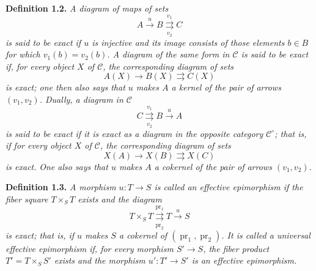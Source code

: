 \medskip
\noindent{}\textbf{Definition 1.2.}
\textit{A diagram of maps of sets}
\[
  A\xrightarrow{u}B
  \overset{v_1}{\underset{v_2}{\rightrightarrows}}C
\]
\textit{is said to be \emph{exact} if \(u\) is injective and its image consists
of those elements \(b\in B\) for which \(v_1(b)=v_2(b)\). A diagram of the
same form in \(\mathscr C\) is said to be \emph{exact} if, for every object
\(X\) of \(\mathscr C\), the corresponding diagram of sets}
\[
  A(X)\longrightarrow B(X)\rightrightarrows C(X)
\]
\textit{is exact; one then also says that \(u\) makes \(A\) a \emph{kernel}
of the pair of arrows \((v_1,v_2)\). Dually, a diagram in \(\mathscr C\)}
\[
  C\overset{v_1}{\underset{v_2}{\rightrightarrows}}B
  \xrightarrow{u}A
\]
\textit{is said to be exact if it is exact as a diagram in the opposite
category \(\mathscr C^{\circ}\); that is, if for every object \(X\) of
\(\mathscr C\), the corresponding diagram of sets}
\[
  X(A)\longrightarrow X(B)\rightrightarrows X(C)
\]
\textit{is exact.}
\textit{One also says that \(u\) makes \(A\) a \emph{cokernel} of the pair of
arrows \((v_1,v_2)\).}

\medskip
\noindent{}\textbf{Definition 1.3.}
\textit{A morphism \(u:T\to S\) is called an \emph{effective epimorphism} if
the fiber square \(T\times_S T\) exists and the diagram}
\[
  T\times_S T
  \overset{\operatorname{pr}_1}{\underset{\operatorname{pr}_2}{\rightrightarrows}}
  T\xrightarrow{u}S
\]
\textit{is exact; that is, if \(u\) makes \(S\) a cokernel of
\((\operatorname{pr}_1,\operatorname{pr}_2)\). It is called a
\emph{universal effective epimorphism} if, for every morphism \(S'\to S\),
the fiber product \(T'=T\times_S S'\) exists and the morphism
\(u':T'\to S'\) is an effective epimorphism.}


